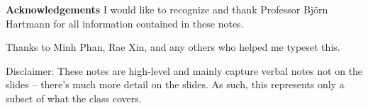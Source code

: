 {\textbf{Acknowledgements}}
I would like to recognize and thank Professor Björn Hartmann for all information contained in these notes. 

Thanks to Minh Phan, Rae Xin, and any others who helped me typeset this.

Disclaimer: These notes are high-level and mainly capture verbal notes not on the slides -- there's much more detail on the slides. As such, this represents only a subset of what the class covers.

